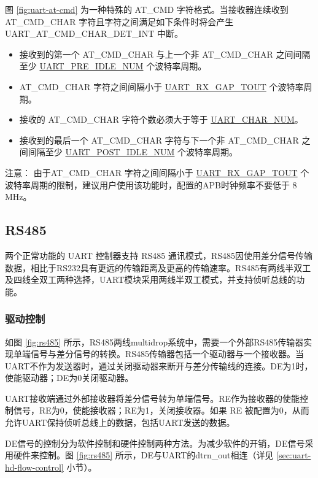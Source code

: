 \documentclass[main\_\_CN.tex]{subfiles}
\begin{document}
图 \ref{fig:uart-at-cmd} 为一种特殊的 AT\_CMD 字符格式。当接收器连续收到 AT\_CMD\_CHAR 字符且字符之间满足如下条件时将会产生 UART\_AT\_CMD\_CHAR\_DET\_INT 中断。


\begin{itemize}
    \item 接收到的第一个 AT\_CMD\_CHAR 与上一个非 AT\_CMD\_CHAR 之间间隔至少 \hyperref[fielddesc:UARTPREIDLENUM]{UART\_PRE\_IDLE\_NUM} 个波特率周期。
    \item AT\_CMD\_CHAR 字符之间间隔小于 \hyperref[fielddesc:UARTRXGAPTOUT]{UART\_RX\_GAP\_TOUT} 个波特率周期。
    \item 接收的 AT\_CMD\_CHAR 字符个数必须大于等于 \hyperref[fielddesc:UARTCHARNUM]{UART\_CHAR\_NUM}。
    \item 接收到的最后一个 AT\_CMD\_CHAR 字符与下一个非 AT\_CMD\_CHAR 之间间隔至少 \hyperref[fielddesc:UARTPOSTIDLENUM]{UART\_POST\_IDLE\_NUM} 个波特率周期。
\end{itemize}

注意： 由于AT\_CMD\_CHAR 字符之间间隔小于 \hyperref[fielddesc:UARTRXGAPTOUT]{UART\_RX\_GAP\_TOUT} 个波特率周期的限制，建议用户使用该功能时，配置的APB时钟频率不要低于 8 MHz。

\subsection{RS485}

两个正常功能的 UART 控制器支持 RS485 通讯模式，RS485因使用差分信号传输数据，相比于RS232具有更远的传输距离及更高的传输速率。RS485有两线半双工及四线全双工两种选择，UART模块采用两线半双工模式，并支持侦听总线的功能。

\subsubsection{驱动控制}

如图 \ref{fig:rs485} 所示，RS485两线multidrop系统中，需要一个外部RS485传输器实现单端信号与差分信号的转换。RS485传输器包括一个驱动器与一个接收器。当UART不作为发送器时，通过关闭驱动器来断开与差分传输线的连接。DE为1时，使能驱动器；DE为0关闭驱动器。

UART接收端通过外部接收器将差分信号转为单端信号。RE作为接收器的使能控制信号，RE为0，使能接收器；RE为1，关闭接收器。如果 RE 被配置为0，从而允许UART保持侦听总线上的数据，包括UART发送的数据。

DE信号的控制分为软件控制和硬件控制两种方法。为减少软件的开销，DE信号采用硬件来控制。图 \ref{fig:rs485} 所示，DE与UART的dtrn\_out相连（详见 \ref{sec:uart-hd-flow-control} 小节）。
\end{document}
